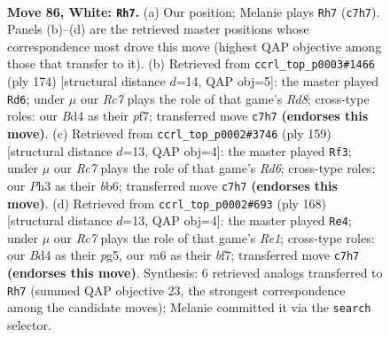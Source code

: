 \documentclass[11pt]{article}
\begin{document}
\clearpage

\begin{figure}[p]\centering
\begin{subfigure}{0.46\textwidth}\centering
\resizebox{\linewidth}{!}{%
\newchessgame
\chessboard[
  setfen={4k3/2R5/r7/8/1K1Bp2p/5p1P/5P2/8 w - - 6 86},
  showmover=false,
  pgfstyle=straightmove, color=movearrow, markmove={c7-h7}
]}
\caption{}
\end{subfigure}\hfill
\begin{subfigure}{0.46\textwidth}\centering
\resizebox{\linewidth}{!}{%
\newchessgame
\chessboard[
  setfen={3R4/5pk1/4p3/4P3/5PP1/8/5K2/1r6 w - - 91 88},
  showmover=false,
  pgfstyle=straightmove, color=movearrow, markmove={d8-d6}
]}
\caption{}
\end{subfigure}
\\[4pt]
\begin{subfigure}{0.46\textwidth}\centering
\resizebox{\linewidth}{!}{%
\newchessgame
\chessboard[
  setfen={R7/8/1B2b1k1/4Pp2/5P1K/3r4/8/8 b - - 58 80},
  showmover=false,
  pgfstyle=straightmove, color=movearrow, markmove={d3-f3}
]}
\caption{}
\end{subfigure}\hfill
\begin{subfigure}{0.46\textwidth}\centering
\resizebox{\linewidth}{!}{%
\newchessgame
\chessboard[
  setfen={8/3k1b2/5p2/2K3p1/6p1/6P1/7P/4R3 w - - 54 85},
  showmover=false,
  pgfstyle=straightmove, color=movearrow, markmove={e1-e4}
]}
\caption{}
\end{subfigure}
\caption{\textbf{Move 86, White: \texttt{Rh7}.} (a) Our position; Melanie plays \texttt{Rh7} (\texttt{c7h7}). Panels (b)--(d) are the retrieved master positions whose correspondence most drove this move (highest QAP objective among those that transfer to it). (b) Retrieved from \texttt{ccrl\_top\_p0003\#1466} (ply 174) [structural distance $d$=14, QAP obj=5]: the master played \texttt{Rd6}; under $\mu$ our \emph{Rc7} plays the role of that game's \emph{Rd8}; cross-type roles: our \emph{B}d4 as their \emph{p}f7; transferred move \texttt{c7h7} \textbf{(endorses this move)}. (c) Retrieved from \texttt{ccrl\_top\_p0002\#3746} (ply 159) [structural distance $d$=13, QAP obj=4]: the master played \texttt{Rf3}; under $\mu$ our \emph{Rc7} plays the role of that game's \emph{Rd6}; cross-type roles: our \emph{P}h3 as their \emph{b}b6; transferred move \texttt{c7h7} \textbf{(endorses this move)}. (d) Retrieved from \texttt{ccrl\_top\_p0002\#693} (ply 168) [structural distance $d$=13, QAP obj=4]: the master played \texttt{Re4}; under $\mu$ our \emph{Rc7} plays the role of that game's \emph{Re1}; cross-type roles: our \emph{B}d4 as their \emph{p}g5, our \emph{r}a6 as their \emph{b}f7; transferred move \texttt{c7h7} \textbf{(endorses this move)}. Synthesis: 6 retrieved analogs transferred to \texttt{Rh7} (summed QAP objective 23, the strongest correspondence among the candidate moves); Melanie committed it via the \texttt{search} selector.}
\label{fig:thought-m170}
\end{figure}
\end{document}
